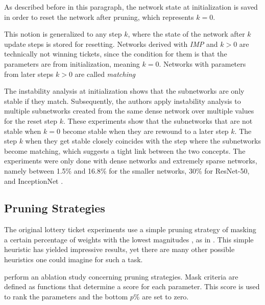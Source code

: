 As described before in this paragraph, the network state at initialization is saved in order to reset the network after pruning, which represents $k=0$.

This notion is generalized to any step $k$, where the state of the network after $k$ update steps is stored for resetting.
Networks derived with \textit{IMP} and $k > 0$ are technically not winning tickets, since the condition for them is that the parameters are from initialization, meaning $k=0$.
Networks with parameters from later steps $k > 0$ are called \textit{matching} \autocite{LinearModeConnectivity}

The instability analysis at initialization shows that the subnetworks are only stable if they match.
Subsequently, the authors apply instability analysis to multiple subnetworks created from the same dense network over multiple values for the reset step $k$.
These experiments show that the subnetworks that are not stable when $k=0$ become stable when they are rewound to a later step $k$.
The step $k$ when they get stable closely coincides with the step where the subnetworks become matching, which suggests a tight link between the two concepts.
The experiments were only done with dense networks and extremely sparse networks, namely between 1.5\% and 16.8\% for the smaller networks, 30\% for ResNet-50, and InceptionNet \autocite{LinearModeConnectivity}.

\subsection{Pruning Strategies}
The original lottery ticket experiments use a simple pruning strategy of masking a certain percentage of weights with the lowest magnitudes \autocite{LTH}, as in \autocite{HanEtAl15}. This simple heuristic has yielded impressive results, yet there are many other possible heuristics one could imagine for such a task.

\textcite{Supermasks} perform an ablation study concerning pruning strategies. Mask criteria are defined as functions that determine a score for each parameter. This score is used to rank the parameters and the bottom $p\%$ are set to zero.

